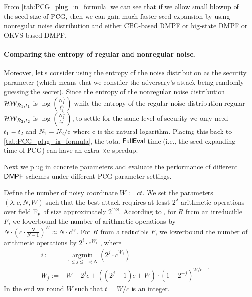 
From \cref{tab:PCG_plug_in_formula} we can see that if we allow small blowup of the seed size of PCG, then we can gain much faster seed expansion by using nonregular noise distribution and either CBC-based DMPF or big-state DMPF or OKVS-based DMPF. 

\paragraph{Comparing the entropy of regular and nonregular noise.}Moreover, let's consider using the entropy of the noise distribution as the security parameter (which means that we consider the adversary's attack being randomly guessing the secret). Since the entropy of the nonregular noise distribution $\mathcal{HW}_{R_1,t_1}$ is $\log(\frac{N_1^{t_1}}{t_1^{t_1}})$ while the entropy of the regular noise distribution regular-$\mathcal{HW}_{R_2,t_2}$ is $\log(\frac{N_2^{t_2}}{t_2!})$, to settle for the same level of security we only need $t_1=t_2$ and $N_1 = N_2/\mathrm{e}$ where $\mathrm{e}$ is the natural logarithm. Placing this back to \cref{tab:PCG_plug_in_formula}, the total ${\sf FullEval}$ time (i.e., the seed expanding time of PCG) can have an extra $\times \mathrm{e}$ speedup. 


Next we plug in concrete parameters and evaluate the performance of different ${\sf DMPF}$ schemes under different PCG parameter settings. 

Define the number of noisy coordinate $W:=ct$. We set the parameters $(\lambda, c, N, W)$ such that the best attack requires at least $2^\lambda$ arithmetic operations over field $\mathbb{F}_p$ of size approximately $2^{128}$. According to \cite{cryptoeprint:2022/1035}, for $R$ from an irreducible $F$, we lowerbound the number of arithmetic operations by $N\cdot (c\cdot \frac{N}{N-1})^W\approx N\cdot c^W$.  For $R$ from a reducible $F$, we lowerbound the number of arithmetic operations by $2^i\cdot c^{W_i}$ , where 
\[
  \begin{split}
    i:=&\mathop{\arg\min}\limits_{1\le j\le \log N}\left(2^j\cdot c^{W_j}\right)\\ W_j:=&W-2^jc+((2^j-1)c+W)\cdot \left(1-2^{-j}\right)^{W/c-1}
  \end{split}
\]
 In the end we round $W$ such that $t=W/c$ is an integer. 


